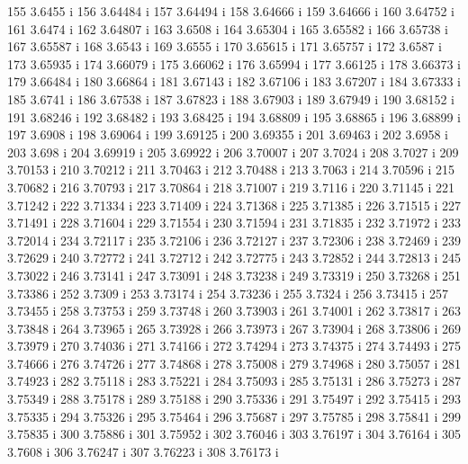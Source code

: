  155  3.6455  i
 156  3.64484  i
 157  3.64494  i
 158  3.64666  i
 159  3.64666  i
 160  3.64752  i
 161  3.6474  i
 162  3.64807  i
 163  3.6508  i
 164  3.65304  i
 165  3.65582  i
 166  3.65738  i
 167  3.65587  i
 168  3.6543  i
 169  3.6555  i
 170  3.65615  i
 171  3.65757  i
 172  3.6587  i
 173  3.65935  i
 174  3.66079  i
 175  3.66062  i
 176  3.65994  i
 177  3.66125  i
 178  3.66373  i
 179  3.66484  i
 180  3.66864  i
 181  3.67143  i
 182  3.67106  i
 183  3.67207  i
 184  3.67333  i
 185  3.6741  i
 186  3.67538  i
 187  3.67823  i
 188  3.67903  i
 189  3.67949  i
 190  3.68152  i
 191  3.68246  i
 192  3.68482  i
 193  3.68425  i
 194  3.68809  i
 195  3.68865  i
 196  3.68899  i
 197  3.6908  i
 198  3.69064  i
 199  3.69125  i
 200  3.69355  i
 201  3.69463  i
 202  3.6958  i
 203  3.698  i
 204  3.69919  i
 205  3.69922  i
 206  3.70007  i
 207  3.7024  i
 208  3.7027  i
 209  3.70153  i
 210  3.70212  i
 211  3.70463  i
 212  3.70488  i
 213  3.7063  i
 214  3.70596  i
 215  3.70682  i
 216  3.70793  i
 217  3.70864  i
 218  3.71007  i
 219  3.7116  i
 220  3.71145  i
 221  3.71242  i
 222  3.71334  i
 223  3.71409  i
 224  3.71368  i
 225  3.71385  i
 226  3.71515  i
 227  3.71491  i
 228  3.71604  i
 229  3.71554  i
 230  3.71594  i
 231  3.71835  i
 232  3.71972  i
 233  3.72014  i
 234  3.72117  i
 235  3.72106  i
 236  3.72127  i
 237  3.72306  i
 238  3.72469  i
 239  3.72629  i
 240  3.72772  i
 241  3.72712  i
 242  3.72775  i
 243  3.72852  i
 244  3.72813  i
 245  3.73022  i
 246  3.73141  i
 247  3.73091  i
 248  3.73238  i
 249  3.73319  i
 250  3.73268  i
 251  3.73386  i
 252  3.7309  i
 253  3.73174  i
 254  3.73236  i
 255  3.7324  i
 256  3.73415  i
 257  3.73455  i
 258  3.73753  i
 259  3.73748  i
 260  3.73903  i
 261  3.74001  i
 262  3.73817  i
 263  3.73848  i
 264  3.73965  i
 265  3.73928  i
 266  3.73973  i
 267  3.73904  i
 268  3.73806  i
 269  3.73979  i
 270  3.74036  i
 271  3.74166  i
 272  3.74294  i
 273  3.74375  i
 274  3.74493  i
 275  3.74666  i
 276  3.74726  i
 277  3.74868  i
 278  3.75008  i
 279  3.74968  i
 280  3.75057  i
 281  3.74923  i
 282  3.75118  i
 283  3.75221  i
 284  3.75093  i
 285  3.75131  i
 286  3.75273  i
 287  3.75349  i
 288  3.75178  i
 289  3.75188  i
 290  3.75336  i
 291  3.75497  i
 292  3.75415  i
 293  3.75335  i
 294  3.75326  i
 295  3.75464  i
 296  3.75687  i
 297  3.75785  i
 298  3.75841  i
 299  3.75835  i
 300  3.75886  i
 301  3.75952  i
 302  3.76046  i
 303  3.76197  i
 304  3.76164  i
 305  3.7608  i
 306  3.76247  i
 307  3.76223  i
 308  3.76173  i
